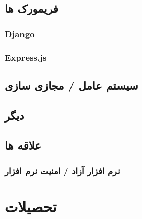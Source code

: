 \documentclass{article}
\begin{document}
\subsection{فریمورک ها}
\subsubsection{Django}
\subsubsection{Express.js}
\subsection{سیستم عامل / مجازی سازی}
\subsubsection{}
\subsubsection{}
\subsection{دیگر}
\subsubsection{}
\subsubsection{}
\subsubsection{}
\subsection{علاقه ها}
\subsubsection{}
\subsubsection{نرم افزار آزاد / امنیت نرم افزار}
\section{تحصیلات} %
\end{document}
